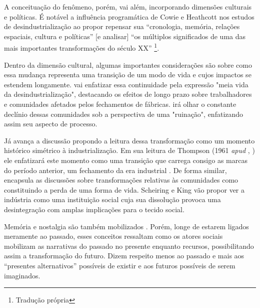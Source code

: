A conceituação do fenômeno, porém, vai além, incorporando dimensões
culturais e políticas. É notável a influência programática de Cowie e
Heathcott nos estudos de desindustrialização ao propor repensar sua
``cronologia, memória, relações espaciais, cultura e políticas'' {[}e
analisar{]} ``os múltiplos significados de uma das mais importantes
transformações do século XX''
\citep[p.~2]{cowie_beyond_2003}\footnote{Tradução própria}.

Dentro da dimensão cultural, algumas importantes considerações são
sobre como essa mudança representa uma transição de um modo de vida e
cujos impactos se estendem longamente. \citet{linkon_half-life_2018} vai enfatizar
essa continuidade pela expressão "meia vida da desindustrialização",
destacando os efeitos de longo prazo sobre trabalhadores e comunidades
afetados pelos fechamentos de fábricas. \citet{mah_industrial_2012} irá olhar o
constante declínio dessas comunidades sob a perspectiva de uma
"ruinação", enfatizando assim seu aspecto de processo.

Já \citet{strangleman_deindustrialisation_2017} avança a
discussão propondo a leitura dessa transformação como um momento
histórico simétrico à industrialização. Em sua leitura de Thompson
(1961 \emph{apud} \citeauthor{strangleman_deindustrialisation_2017}, \citeyear{strangleman_deindustrialisation_2017}) ele enfatizará este
momento como uma transição que carrega consigo as marcas do período
anterior, um fechamento da era industrial
\citep[p.~467]{strangleman_deindustrialisation_2017}. De forma similar, \citet[p.~694]{hoekstra_iconic_2020}
encapsula as discussões sobre transformações relativas às comunidades
como constituindo a perda de uma forma de vida. Scheiring e King
\citep[p.~144]{scheiring_deindustrialization_2023}vão propor ver a indústria como uma instituição social
cuja sua dissolução provoca uma desintegração com amplas implicações
para o tecido social.

Memória e nostalgia são também mobilizados
\citep{clark_voices_2020,clarke_closing_2015,lewis_regenerating_2016,nettleingham_beyond_2019}. Porém, longe de
estarem ligados meramente ao passado, esses conceitos ressaltam como os
atores sociais mobilizam as narrativas do passado no presente enquanto
recursos, possibilitando assim a transformação do futuro. Dizem respeito
menos ao passado e mais aos ``presentes alternativos''
\citep[p.~119--123]{clarke_closing_2015} possíveis de existir e aos futuros possíveis de serem
imaginados.

